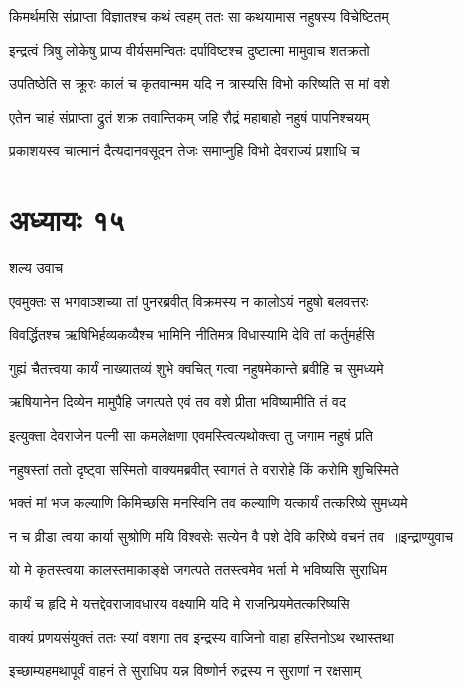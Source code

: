 \twolineshloka
{किमर्थमसि संप्राप्ता विज्ञातश्च कथं त्वहम्}
{ततः सा कथयामास नहुषस्य विचेष्टितम्}


\twolineshloka
{इन्द्रत्वं त्रिषु लोकेषु प्राप्य वीर्यसमन्वितः}
{दर्पाविष्टश्च दुष्टात्मा मामुवाच शतक्रतो}


\twolineshloka
{उपतिष्ठेति स क्रूरः कालं च कृतवान्मम}
{यदि न त्रास्यसि विभो करिष्यति स मां वशे}


\twolineshloka
{एतेन चाहं संप्राप्ता द्रुतं शक्र तवान्तिकम्}
{जहि रौद्रं महाबाहो नहुषं पापनिश्चयम्}


\twolineshloka
{प्रकाशयस्व चात्मानं दैत्यदानवसूदन}
{तेजः समाप्नुहि विभो देवराज्यं प्रशाधि च}


\chapter{अध्यायः १५}
\twolineshloka
{शल्य उवाच}
{}


\twolineshloka
{एवमुक्तः स भगवाञ्शच्या तां पुनरब्रवीत्}
{विक्रमस्य न कालोऽयं नहुषो बलवत्तरः}


\twolineshloka
{विवर्द्धितश्च ऋषिभिर्हव्यकव्यैश्च भामिनि}
{नीतिमत्र विधास्यामि देवि तां कर्तुमर्हसि}


\twolineshloka
{गुह्यं चैतत्त्वया कार्यं नाख्यातव्यं शुभे क्वचित्}
{गत्वा नहुषमेकान्ते ब्रवीहि च सुमध्यमे}


\twolineshloka
{ऋषियानेन दिव्येन मामुपैहि जगत्पते}
{एवं तव वशे प्रीता भविष्यामीति तं वद}


\twolineshloka
{इत्युक्ता देवराजेन पत्नी सा कमलेक्षणा}
{एवमस्त्वित्यथोक्त्वा तु जगाम नहुषं प्रति}


\twolineshloka
{नहुषस्तां ततो दृष्ट्वा सस्मितो वाक्यमब्रवीत्}
{स्वागतं ते वरारोहे किं करोमि शुचिस्मिते}


\twolineshloka
{भक्तं मां भज कल्याणि किमिच्छसि मनस्विनि}
{तव कल्याणि यत्कार्यं तत्करिष्ये सुमध्यमे}


\threelineshloka
{न च व्रीडा त्वया कार्या सुश्रोणि मयि विश्वसेः}
{सत्येन वै पशे देवि करिष्ये वचनं तव ॥इन्द्राण्युवाच}
{}


\twolineshloka
{यो मे कृतस्त्वया कालस्तमाकाङ्क्षे जगत्पते}
{ततस्त्वमेव भर्ता मे भविष्यसि सुराधिम}


\twolineshloka
{कार्यं च हृदि मे यत्तद्देवराजावधारय}
{वक्ष्यामि यदि मे राजन्प्रियमेतत्करिष्यसि}


\twolineshloka
{वाक्यं प्रणयसंयुक्तं ततः स्यां वशगा तव}
{इन्द्रस्य वाजिनो वाहा हस्तिनोऽथ रथास्तथा}


\twolineshloka
{इच्छाम्यहमथापूर्वं वाहनं ते सुराधिप}
{यन्न विष्णोर्न रुद्रस्य न सुराणां न रक्षसाम्}


